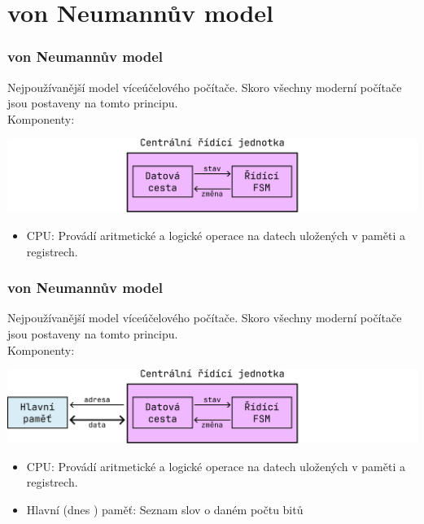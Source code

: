 \documentclass[aspectratio=169,11pt,svgnames]{beamer}
\begin{document}
\section{von Neumannův model}

\begin{frame}
 \frametitle{von Neumannův model}
 Nejpoužívanější model víceúčelového počítače. Skoro všechny moderní počítače
 jsou postaveny na tomto principu.\\
 \pause
 Komponenty:
 \vspace*{-1em}
 \begin{center}
  \includegraphics[width=.75\textwidth]{von-neumann-1.pdf}
 \end{center}
 \begin{itemize}[label=\textbullet]
  \item \alert{CPU}: Provádí aritmetické a logické operace na datech uložených v
   paměti a registrech.
 \end{itemize}
\end{frame}

\begin{frame}
 \frametitle{von Neumannův model}
 Nejpoužívanější model víceúčelového počítače. Skoro všechny moderní počítače
 jsou postaveny na tomto principu.\\
 \pause
 Komponenty:
 \vspace*{-1em}
 \begin{center}
  \includegraphics[width=.75\textwidth]{von-neumann-2.pdf}
 \end{center}
 \begin{itemize}[label=\textbullet]
  \item \alert{CPU}: Provádí aritmetické a logické operace na datech uložených v
   paměti a registrech.
  \item \alert{Hlavní (dnes ) paměť}: Seznam \alert{slov} o daném
   počtu \alert{bitů} 
 \end{itemize}
\end{frame}
\end{document}
